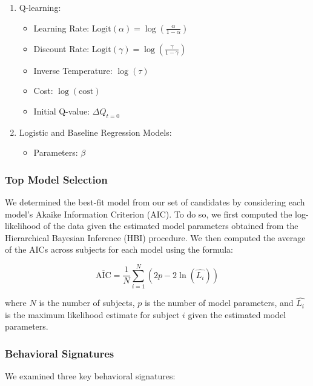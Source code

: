 \documentclass[
  number,
  preprint,
  3p,
  onecolumn]{elsarticle}
\providecommand{\tightlist}{%
  \setlength{\itemsep}{0pt}\setlength{\parskip}{0pt}}\usepackage{longtable,booktabs,array}
\begin{document}
\begin{enumerate}
\def\labelenumi{\arabic{enumi}.}
\tightlist
\item
  Q-learning:

  \begin{itemize}
  \tightlist
  \item
    Learning Rate:
    \(\text{Logit}(\alpha)=\log(\frac{\alpha}{1-\alpha})\)
  \item
    Discount Rate:
    \(\text{Logit}(\gamma)=\log(\frac{\gamma}{1-\gamma})\)
  \item
    Inverse Temperature: \(\log(\tau)\)
  \item
    Cost: \(\log(\text{cost})\)
  \item
    Initial Q-value: \(\Delta Q_{t=0}\)
  \end{itemize}
\item
  Logistic and Baseline Regression Models:

  \begin{itemize}
  \tightlist
  \item
    Parameters: \(\beta\)
  \end{itemize}
\end{enumerate}

\subsubsection{Top Model Selection}\label{top-model-selection-1}

We determined the best-fit model from our set of candidates by
considering each model's Akaike Information Criterion (AIC). To do so,
we first computed the log-likelihood of the data given the estimated
model parameters obtained from the Hierarchical Bayesian Inference (HBI)
procedure. We then computed the average of the AICs across subjects for
each model using the formula:

\[
\overline{\text{AIC}} = \frac{1}{N} \sum_{i=1}^{N} \left( 2p - 2\ln(\hat{L_i}) \right)
\]

where \(N\) is the number of subjects, \(p\) is the number of model
parameters, and \(\hat{L_i}\) is the maximum likelihood estimate for
subject \(i\) given the estimated model parameters.

\subsubsection{Behavioral Signatures}\label{behavioral-signatures}

We examined three key behavioral signatures:
\end{document}
